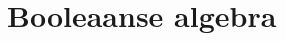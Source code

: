 \documentclass[main.tex]{subfiles}
\begin{document}
\chapter{Booleaanse algebra}
\label{cha:booleaanse-algebra}
\end{document}
